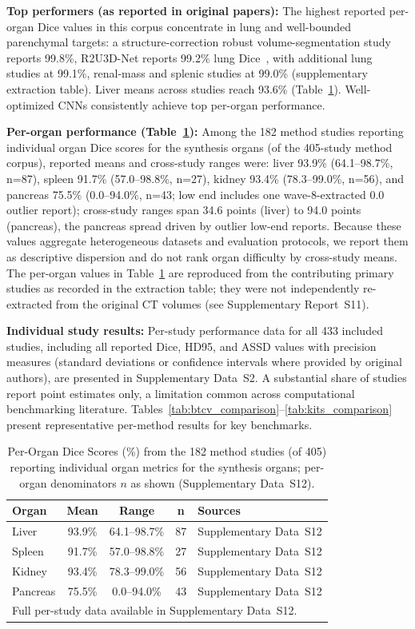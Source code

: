 \textbf{Top performers (as reported in original papers):} The highest reported per-organ Dice values in this corpus concentrate in lung and well-bounded parenchymal targets: a structure-correction robust volume-segmentation study reports 99.8\%, R2U3D-Net reports 99.2\% lung Dice~\cite{dhaval2021ru}, with additional lung studies at 99.1\%, renal-mass and splenic studies at 99.0\% (supplementary extraction table). Liver means across studies reach 93.6\% (Table~\ref{tab:synthesized_dice}). Well-optimized CNNs consistently achieve top per-organ performance.

\textbf{Per-organ performance (Table~\ref{tab:synthesized_dice}):} Among the 182 method studies reporting individual organ Dice scores for the synthesis organs (of the 405-study method corpus), reported means and cross-study ranges were: liver 93.9\% (64.1--98.7\%, n=87), spleen 91.7\% (57.0--98.8\%, n=27), kidney 93.4\% (78.3--99.0\%, n=56), and pancreas 75.5\% (0.0--94.0\%, n=43; low end includes one wave-8-extracted 0.0 outlier report); cross-study ranges span 34.6 points (liver) to 94.0 points (pancreas), the pancreas spread driven by outlier low-end reports. Because these values aggregate heterogeneous datasets and evaluation protocols, we report them as descriptive dispersion and do not rank organ difficulty by cross-study means. The per-organ values in Table~\ref{tab:synthesized_dice} are reproduced from the contributing primary studies as recorded in the extraction table; they were not independently re-extracted from the original CT volumes (see Supplementary Report~S11).

\textbf{Individual study results:} Per-study performance data for all 433 included studies, including all reported Dice, HD95, and ASSD values with precision measures (standard deviations or confidence intervals where provided by original authors), are presented in Supplementary Data~S2. A substantial share of studies report point estimates only, a limitation common across computational benchmarking literature. Tables~\ref{tab:btcv_comparison}--\ref{tab:kits_comparison} present representative per-method results for key benchmarks.

\begin{table}[!htb]
\centering
\small
\caption{Per-Organ Dice Scores (\%) from the 182 method studies (of 405) reporting individual organ metrics for the synthesis organs; per-organ denominators $n$ as shown (Supplementary Data~S12).}
\label{tab:synthesized_dice}
\begin{tabular}{@{}lcccl@{}}
\toprule
\textbf{Organ} & \textbf{Mean} & \textbf{Range} & \textbf{n} & \textbf{Sources} \\
\midrule
Liver & 93.9\% & 64.1--98.7\% & 87 & Supplementary Data~S12 \\
Spleen & 91.7\% & 57.0--98.8\% & 27 & Supplementary Data~S12 \\
Kidney & 93.4\% & 78.3--99.0\% & 56 & Supplementary Data~S12 \\
Pancreas & 75.5\% & 0.0--94.0\% & 43 & Supplementary Data~S12 \\
\bottomrule
\multicolumn{5}{l}{\footnotesize Full per-study data available in Supplementary Data~S12.}
\end{tabular}
\end{table}

